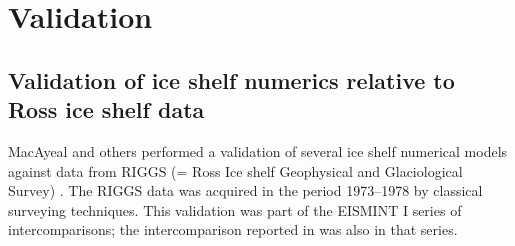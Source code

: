 \documentclass[11pt,final]{amsart}
\begin{document}

\clearpage\newpage
\section{Validation}\label{sect:valid}

\subsection{Validation of ice shelf numerics relative to Ross ice shelf data}  MacAyeal and others \cite{MacAyealetal} performed a validation of several ice shelf numerical models against data from RIGGS (= Ross Ice shelf Geophysical and Glaciological Survey) \cite{RIGGS1,RIGGS2}.  The RIGGS data was acquired in the period 1973--1978 by classical surveying techniques.   This validation was part of the EISMINT I  series of intercomparisons; the intercomparison reported in \cite{EISMINT96} was also in that series.
\end{document}
